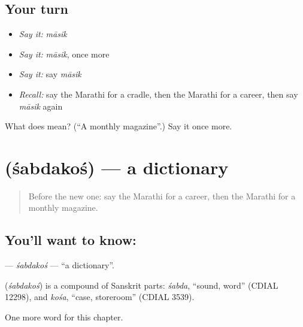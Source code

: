 \subsection*{Your turn}
\begin{itemize}
\raggedright
  \item \emph{Say it:} \emph{māsik}
  \item \emph{Say it:} \emph{māsik}, once more
  \item \emph{Say it:} say \emph{māsik}
  \item \emph{Recall:} say the Marathi for a cradle, then the Marathi for a career, then say \emph{māsik} again
\end{itemize}

\begin{tcolorbox}[breakable,colback=teal!4,colframe=teal!35!black,title={Before you move on}]
What does  mean? (\textquotedblleft{}A monthly magazine\textquotedblright{}.) Say it once more.
\end{tcolorbox}
\section[\texorpdfstring{\mr{शब्दकोश} (śabdakoś)}{शब्दकोश (śabdakoś)}]{ (śabdakoś) — a dictionary}

\label{lesson:MR-C222-sabdakos}



\begin{quote}
Before the new one: say the Marathi for a career, then the Marathi for a monthly magazine.
\end{quote}

\subsection*{You'll want to know: }
\textbf{} — \emph{śabdakoś} — \textquotedblleft{}a dictionary\textquotedblright{}.

\begin{cousinweb}
\textbf{} (\emph{śabdakoś}) is a compound of Sanskrit parts: \emph{śabda}, \textquotedblleft{}sound, word\textquotedblright{} (CDIAL 12298), and \emph{kośa}, \textquotedblleft{}case, storeroom\textquotedblright{} (CDIAL 3539).
\end{cousinweb}

\begin{grammarlens}[title={What you've built}]
One more word for this chapter.
\end{grammarlens}

